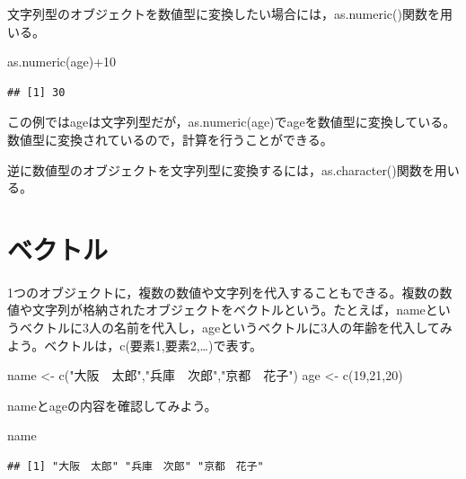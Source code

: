 \documentclass[
]{book}
\newenvironment{Shaded}{\begin{snugshade}}{\end{snugshade}}
\newcommand{\DecValTok}[1]{\textcolor[rgb]{0.00,0.00,0.81}{#1}}
\newcommand{\FunctionTok}[1]{\textcolor[rgb]{0.00,0.00,0.00}{#1}}
\newcommand{\NormalTok}[1]{#1}
\newcommand{\OtherTok}[1]{\textcolor[rgb]{0.56,0.35,0.01}{#1}}
\newcommand{\SpecialCharTok}[1]{\textcolor[rgb]{0.00,0.00,0.00}{#1}}
\newcommand{\StringTok}[1]{\textcolor[rgb]{0.31,0.60,0.02}{#1}}
\begin{document}
文字列型のオブジェクトを数値型に変換したい場合には，as.numeric()関数を用いる。

\begin{Shaded}
\begin{Highlighting}[]
\FunctionTok{as.numeric}\NormalTok{(age)}\SpecialCharTok{+}\DecValTok{10}
\end{Highlighting}
\end{Shaded}

\begin{verbatim}
## [1] 30
\end{verbatim}

この例ではageは文字列型だが，as.numeric(age)でageを数値型に変換している。数値型に変換されているので，計算を行うことができる。

逆に数値型のオブジェクトを文字列型に変換するには，as.character()関数を用いる。

\hypertarget{ux30d9ux30afux30c8ux30eb}{%
\section{ベクトル}\label{ux30d9ux30afux30c8ux30eb}}

1つのオブジェクトに，複数の数値や文字列を代入することもできる。複数の数値や文字列が格納されたオブジェクトをベクトルという。たとえば，nameというベクトルに3人の名前を代入し，ageというベクトルに3人の年齢を代入してみよう。ベクトルは，c(要素1,要素2,\ldots)で表す。

\begin{Shaded}
\begin{Highlighting}[]
\NormalTok{name }\OtherTok{\textless{}{-}} \FunctionTok{c}\NormalTok{(}\StringTok{"大阪　太郎"}\NormalTok{,}\StringTok{"兵庫　次郎"}\NormalTok{,}\StringTok{"京都　花子"}\NormalTok{)}
\NormalTok{age }\OtherTok{\textless{}{-}} \FunctionTok{c}\NormalTok{(}\DecValTok{19}\NormalTok{,}\DecValTok{21}\NormalTok{,}\DecValTok{20}\NormalTok{)}
\end{Highlighting}
\end{Shaded}

nameとageの内容を確認してみよう。

\begin{Shaded}
\begin{Highlighting}[]
\NormalTok{name}
\end{Highlighting}
\end{Shaded}

\begin{verbatim}
## [1] "大阪　太郎" "兵庫　次郎" "京都　花子"
\end{verbatim}
\end{document}
